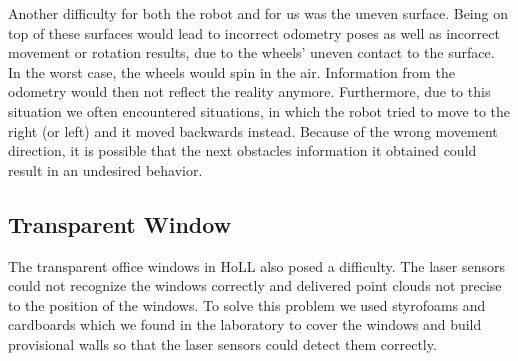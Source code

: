Another difficulty for both the robot and for us was the uneven surface. Being on top of these surfaces would lead to incorrect odometry poses as well as incorrect movement or rotation results, due to the wheels' uneven contact to the surface. In the worst case, the wheels would spin in the air. Information from the odometry would then not reflect the reality anymore. Furthermore, due to this situation we often encountered situations, in which the robot tried to move to the right (or left) and it moved backwards instead. Because of the wrong movement direction, it is possible that the next obstacles information it obtained could result in an undesired behavior.

\subsection{Transparent Window}

The transparent office windows in HoLL also posed a difficulty. The laser sensors could not recognize the windows correctly and delivered point clouds not precise to the position of the windows. To solve this problem we used styrofoams and cardboards which we found in the laboratory to cover the windows and build provisional walls so that the laser sensors could detect them correctly.




